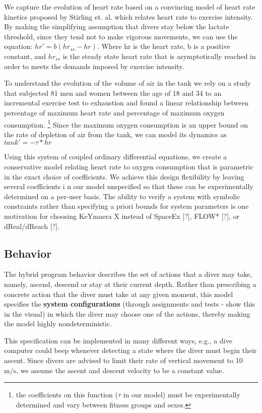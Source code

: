 \documentclass[sigconf,screen]{acmart}
\newcommand{\varheart}{hr}
\begin{document}
We capture the evolution of heart rate based on a convincing model of heart rate kinetics proposed by Stirling et. al. which relates heart rate to exercise intensity. By making the simplifying assumption that divers stay below the lactate threshold, since they tend not to make vigorous movements, we can use the equation:
$hr' = b(hr_{ss} - hr)$. Where hr is the heart rate, b is a positive constant, and $hr_{ss}$ is the steady state heart rate that is asymptotically reached in order to meets the demands imposed by exercise intensity.

To understand the evolution of the volume of air in the tank we rely on a study that subjected 81 men and women between the age of 18 and 34 to an incremental exercise test to exhaustion and found a linear relationship between percentage of maximum heart rate and percentage of maximum oxygen consumption. \footnote[2]{the coefficients on this function ($\tau$ in our model) must be experimentally determined and vary between fitness groups and sexes.} Since the maximum oxygen consumption is an upper bound on the rate of depletion of air from the tank, we can model its dynamics as $tank' = - \tau * \varheart$

Using this system of coupled ordinary differential equations, we create a conservative model relating heart rate to oxygen consumption that is parametric in the exact choice of coefficients. We achieve this design flexibility by leaving several coefficients i
n our model unspecified so that these can be experimentally determined on a per-user basis. The ability to verify a system with symbolic constraints rather than specifying a priori bounds for system parameters is one motivation for choosing KeYmaera X instead of SpaceEx [?], FLOW* [?], or dReal/dReach [?].

\subsection{Behavior}
The hybrid program behavior describes the set of actions that a diver may take, namely, ascend, descend or stay at their current depth. Rather than prescribing a concrete action that the diver must take at any given moment, this model specifies the \textbf{system configurations} (through assignments and tests - show this in the visual) in which the diver may choose one of the actions, thereby making the model highly nondeterministic. 

This specification can be implemented in many different ways, e.g., a dive computer could beep whenever detecting a state where the diver must begin their ascent. Since divers are advised to limit their rate of vertical movement to 10 m/s, we assume the ascent and descent velocity to be a constant value. 
\end{document}
